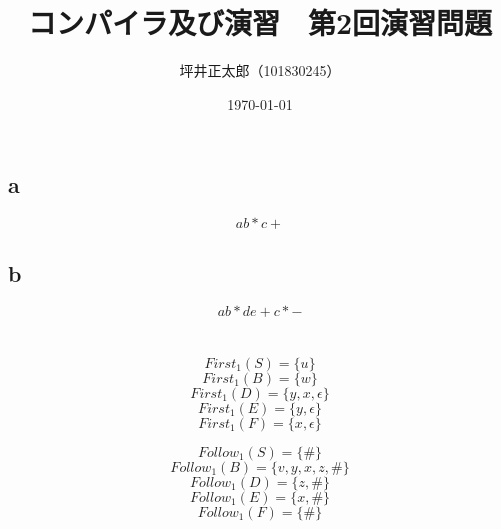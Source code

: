 \documentclass[a4paper,10pt]{jsarticle}
\begin{document}
\title{コンパイラ及び演習　第2回演習問題}
\author{坪井正太郎（101830245）}
\date{\today}
\maketitle
\section{}
\subsection{a}
\[a b * c +\]

\subsection{b}
\[a b * d e + c * -\]

\section{}
\subsection{}
\[First_1(S)=\{u\}\]
\[First_1(B)=\{w\}\]
\[First_1(D)=\{y,x,\epsilon\}\]
\[First_1(E)=\{y,\epsilon\}\]
\[First_1(F)=\{x,\epsilon\}\]

\[Follow_1(S)=\{\#\}\]
\[Follow_1(B)=\{v,y,x,z,\#\}\]
\[Follow_1(D)=\{z,\#\}\]
\[Follow_1(E)=\{x,\#\}\]
\[Follow_1(F)=\{\#\}\]

\subsection{}

\subsection{}
\end{document}
